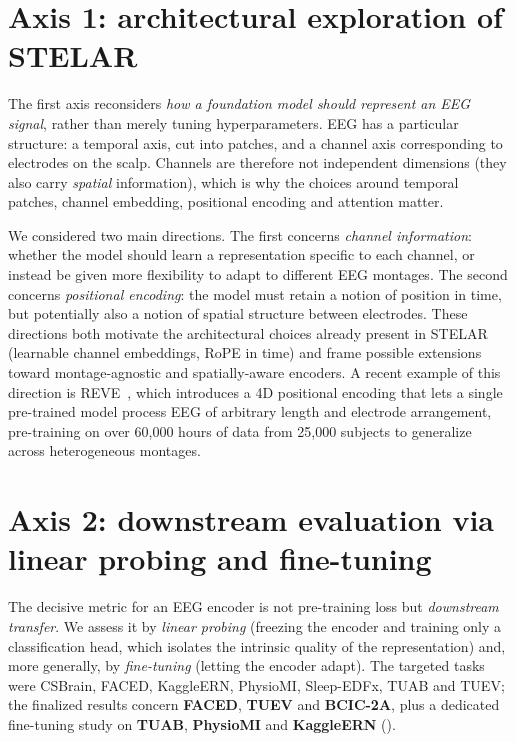 \documentclass[11pt]{article}
\begin{document}
\section{Axis 1: architectural exploration of STELAR}
\label{sec:arch-explore}

The first axis reconsiders \emph{how a foundation model should represent an EEG
signal}, rather than merely tuning hyperparameters. EEG has a particular
structure: a temporal axis, cut into patches, and a channel axis corresponding to
electrodes on the scalp. Channels are therefore not independent dimensions
(they also carry \emph{spatial} information), which is why the choices around
temporal patches, channel embedding, positional encoding and attention matter.

We considered two main directions. The first concerns \emph{channel information}:
whether the model should learn a representation specific to each channel, or
instead be given more flexibility to adapt to different EEG montages. The second
concerns \emph{positional encoding}: the model must retain a notion of position in
time, but potentially also a notion of spatial structure between electrodes.
These directions both motivate the architectural choices already present in STELAR
(learnable channel embeddings, RoPE in time) and frame possible extensions toward
montage-agnostic and spatially-aware encoders. A recent example of this direction
is REVE~\cite{reve}, which introduces a 4D positional encoding that lets a single
pre-trained model process EEG of arbitrary length and electrode arrangement,
pre-training on over 60{,}000 hours of data from 25{,}000 subjects to generalize
across heterogeneous montages.

\section{Axis 2: downstream evaluation via linear probing and fine-tuning}
\label{sec:downstream}

The decisive metric for an EEG encoder is not pre-training loss but
\emph{downstream transfer}. We assess it by \emph{linear probing} (freezing the
encoder and training only a classification head, which isolates the intrinsic
quality of the representation) and, more generally, by \emph{fine-tuning} (letting
the encoder adapt). The targeted tasks were CSBrain, FACED, KaggleERN, PhysioMI,
Sleep-EDFx, TUAB and TUEV; the finalized results concern \textbf{FACED},
\textbf{TUEV} and \textbf{BCIC-2A}, plus a dedicated fine-tuning study on
\textbf{TUAB}, \textbf{PhysioMI} and \textbf{KaggleERN} ().
\end{document}
